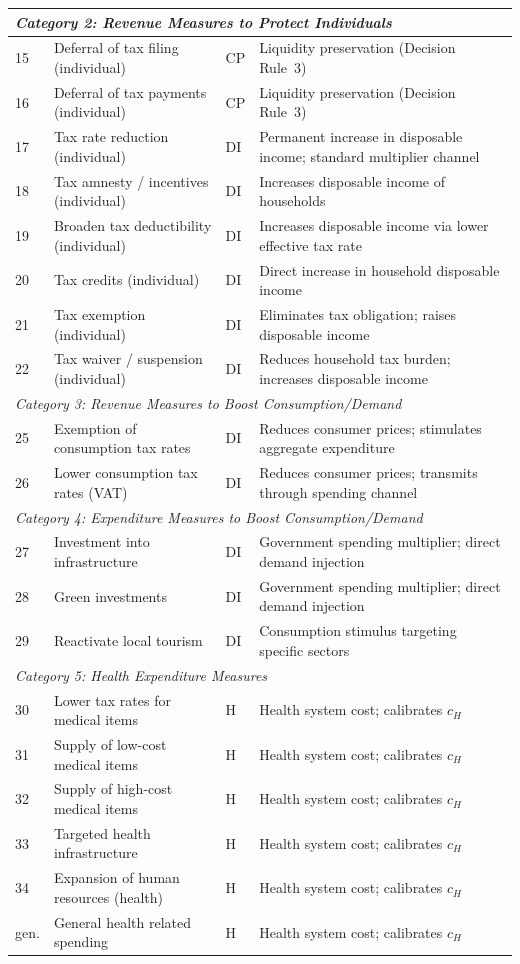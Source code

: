 \documentclass[12pt,a4paper]{article}
\begin{document}
\begin{small}
\begin{longtable}{p{0.6cm} p{5.8cm} p{1.2cm} p{5.5cm}}
\multicolumn{4}{l}{\textit{Category 2: Revenue Measures to Protect Individuals}} \\
\midrule
15 & Deferral of tax filing (individual) & CP & Liquidity preservation (Decision Rule~3) \\
16 & Deferral of tax payments (individual) & CP & Liquidity preservation (Decision Rule~3) \\
17 & Tax rate reduction (individual) & DI & Permanent increase in disposable income; standard multiplier channel \\
18 & Tax amnesty / incentives (individual) & DI & Increases disposable income of households \\
19 & Broaden tax deductibility (individual) & DI & Increases disposable income via lower effective tax rate \\
20 & Tax credits (individual) & DI & Direct increase in household disposable income \\
21 & Tax exemption (individual) & DI & Eliminates tax obligation; raises disposable income \\
22 & Tax waiver / suspension (individual) & DI & Reduces household tax burden; increases disposable income \\
\midrule

\multicolumn{4}{l}{\textit{Category 3: Revenue Measures to Boost Consumption/Demand}} \\
\midrule
25 & Exemption of consumption tax rates & DI & Reduces consumer prices; stimulates aggregate expenditure \\
26 & Lower consumption tax rates (VAT) & DI & Reduces consumer prices; transmits through spending channel \\
\midrule

\multicolumn{4}{l}{\textit{Category 4: Expenditure Measures to Boost Consumption/Demand}} \\
\midrule
27 & Investment into infrastructure & DI & Government spending multiplier; direct demand injection \\
28 & Green investments & DI & Government spending multiplier; direct demand injection \\
29 & Reactivate local tourism & DI & Consumption stimulus targeting specific sectors \\
\midrule

\multicolumn{4}{l}{\textit{Category 5: Health Expenditure Measures}} \\
\midrule
30 & Lower tax rates for medical items & H & Health system cost; calibrates $c_H$ \\
31 & Supply of low-cost medical items & H & Health system cost; calibrates $c_H$ \\
32 & Supply of high-cost medical items & H & Health system cost; calibrates $c_H$ \\
33 & Targeted health infrastructure & H & Health system cost; calibrates $c_H$ \\
34 & Expansion of human resources (health) & H & Health system cost; calibrates $c_H$ \\
gen. & General health related spending & H & Health system cost; calibrates $c_H$ \\
\midrule


\end{longtable}
\end{small}
\end{document}
